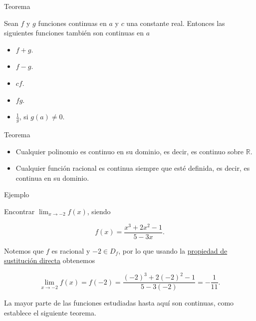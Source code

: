 \documentclass[
  letterpaper,
]{book}
\theoremstyle{plain}
\theoremstyle{remark}
\begin{document}
\label{teo-continuas}
Teorema

Sean \(f\) y \(g\) funciones continuas en \(a\) y \(c\) una constante
real. Entonces las siguientes funciones también son continuas en \(a\)

\begin{itemize}
\item
  \(f+g\).
\item
  \(f-g\).
\item
  \(cf\).
\end{itemize}

\begin{itemize}
\item
  \(fg\).
\item
  \(\displaystyle \frac{1}{g}\), si \(g(a)\neq  0\).
\end{itemize}

Teorema

\begin{itemize}
\item
  Cualquier polinomio es continuo en su dominio, es decir, es continuo
  sobre \(\mathbb{R}\).
\item
  Cualquier función racional es continua siempre que esté definida, es
  decir, es continua en su dominio.
\end{itemize}

Ejemplo

Encontrar \(\lim_{x\to -2} f(x)\), siendo

\[
f(x)=\frac{x^3+2x^2-1}{5-3x}.
\]

\begin{tcolorbox}[enhanced jigsaw, opacityback=0, left=2mm, opacitybacktitle=0.6, toprule=.15mm, bottomrule=.15mm, colbacktitle=quarto-callout-tip-color!10!white, titlerule=0mm, bottomtitle=1mm, title=\textcolor{quarto-callout-tip-color}{\faLightbulb}\hspace{0.5em}{Solución}, toptitle=1mm, colframe=quarto-callout-tip-color-frame, colback=white, breakable, rightrule=.15mm, arc=.35mm, leftrule=.75mm, coltitle=black]

Notemos que \(f\) es racional y \(-2\in D_f\), por lo que usando la
\hyperref[teo-sust-directa]{propiedad de sustitución directa} obtenemos

\[
\lim_{x\to -2} f(x)=f(-2)=\frac{(-2)^3+2(-2)^2-1}{5-3(-2)}=-\frac{1}{11}.
\]

\end{tcolorbox}

La mayor parte de las funciones estudiadas hasta aquí son continuas,
como establece el siguiente teorema.
\end{document}
